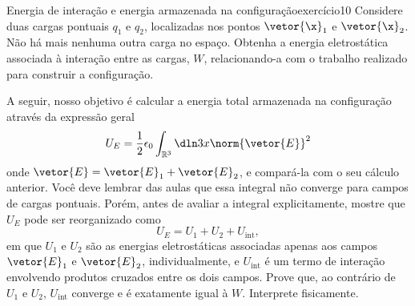 \begin{exercício}{Energia de interação e energia armazenada na configuração}{exercício10}
    Considere duas cargas pontuais \(q_1\) e \(q_2\), localizadas nos pontos \(\vetor{\x}_1\) e \(\vetor{\x}_2\). Não há mais nenhuma outra carga no espaço. Obtenha a energia eletrostática associada à interação entre as cargas, \(W\), relacionando-a com o trabalho realizado para construir a configuração.

    A seguir, nosso objetivo é calcular a energia total armazenada na configuração através da expressão geral
    \begin{equation*}
        U_E = \frac12 \epsilon_0 \int_{\mathbb{R}^3}\dln3x\norm{\vetor{E}}^2
    \end{equation*}
    onde \(\vetor{E} = \vetor{E}_1 + \vetor{E}_2\), e compará-la com o seu cálculo anterior. Você deve lembrar das aulas que essa integral não converge para campos de cargas pontuais. Porém, antes de avaliar a integral explicitamente, mostre que \(U_E\) pode ser reorganizado como
    \begin{equation*}
        U_E = U_1 + U_2 + U_\mathrm{int},
    \end{equation*}
    em que \(U_1\) e \(U_2\) são as energias eletrostáticas associadas apenas aos campos \(\vetor{E}_1\) e \(\vetor{E}_2\), individualmente, e \(U_{\mathrm{int}}\) é um termo de interação envolvendo produtos cruzados entre os dois campos. Prove que, ao contrário de \(U_1\) e \(U_2\), \(U_\mathrm{int}\) converge e é exatamente igual à \(W\). Interprete fisicamente.
\end{exercício}
